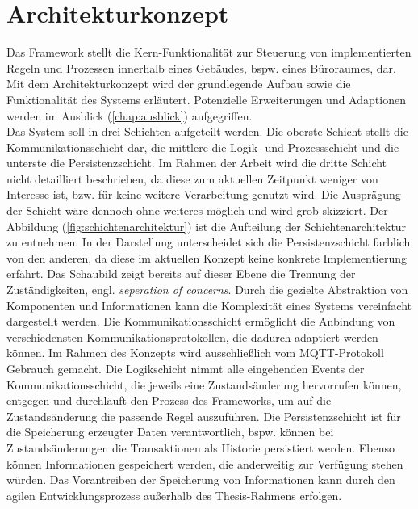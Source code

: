 \section{Architekturkonzept}
\label{sec:architekturkonzept}
    Das Framework stellt die Kern-Funktionalität zur Steuerung von implementierten Regeln und Prozessen innerhalb eines 
    Gebäudes, bspw. eines Büroraumes, dar. Mit dem Architekturkonzept wird der grundlegende Aufbau sowie die Funktionalität des Systems erläutert. 
    Potenzielle Erweiterungen und Adaptionen werden im Ausblick (\ref{chap:ausblick}) aufgegriffen.
    \\ 
    \linebreak
    Das System soll in drei Schichten aufgeteilt werden. Die oberste Schicht stellt die Kommunikationsschicht dar, die mittlere 
    die Logik- und Prozessschicht und die unterste die Persistenzschicht. Im Rahmen der Arbeit wird 
    die dritte Schicht nicht detailliert beschrieben, da diese zum aktuellen Zeitpunkt weniger von Interesse ist, bzw. für keine weitere Verarbeitung 
    genutzt wird. Die Ausprägung der Schicht wäre dennoch ohne weiteres möglich und wird grob skizziert. Der Abbildung 
    (\ref{fig:schichtenarchitektur}) ist die Aufteilung der Schichtenarchitektur zu entnehmen. In der Darstellung unterscheidet sich die 
    Persistenzschicht farblich von den anderen, da diese im aktuellen Konzept keine konkrete Implementierung erfährt. 
    Das Schaubild zeigt bereits auf dieser Ebene die Trennung der Zuständigkeiten, engl. \textit{seperation of concerns}. 
    Durch die gezielte Abstraktion von Komponenten und Informationen kann die Komplexität 
    eines Systems vereinfacht dargestellt werden. Die Kommunikationsschicht ermöglicht die Anbindung von verschiedensten Kommunikationsprotokollen, die 
    dadurch adaptiert werden können. Im Rahmen des Konzepts wird ausschließlich vom \acs{MQTT}-Protokoll Gebrauch gemacht. 
    Die Logikschicht nimmt alle eingehenden Events der Kommunikationsschicht, die jeweils eine Zustandsänderung hervorrufen können, entgegen 
    und durchläuft den Prozess des Frameworks, um auf die Zustandsänderung die passende Regel auszuführen. Die 
    Persistenzschicht ist für die Speicherung erzeugter Daten verantwortlich, bspw. können bei Zustandsänderungen die Transaktionen 
    als Historie persistiert werden. Ebenso können Informationen gespeichert werden, die anderweitig zur Verfügung stehen würden. Das Vorantreiben der Speicherung 
    von Informationen kann durch den agilen Entwicklungsprozess außerhalb des Thesis-Rahmens erfolgen. 
